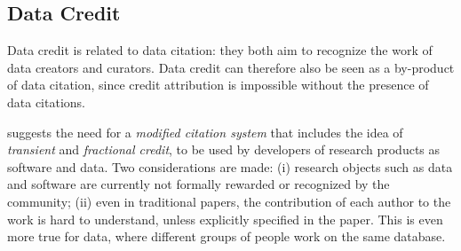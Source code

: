 \documentclass[preprint,12pt,sort&compress]{elsarticle}
\begin{document}
%



\subsection{Data Credit}
Data credit is related to data citation: they both aim to recognize the work of data creators and curators. 
Data credit can therefore also be seen as a by-product of data citation, since credit attribution is impossible without the presence of data citations.

\citet{transitiveCreditKatz2014} suggests the need for a \emph{modified citation system} that includes the idea of \emph{transient} and \emph{fractional credit}, to be used by developers of research products as software and data.
Two considerations are made: (i) research objects such as data and software are currently not formally rewarded or recognized by the community; 
(ii) even in traditional papers, the contribution of each author to the work is hard to understand, unless explicitly specified in the paper. 
This is even more true for data, where different groups of people work on the same database.
\end{document}
